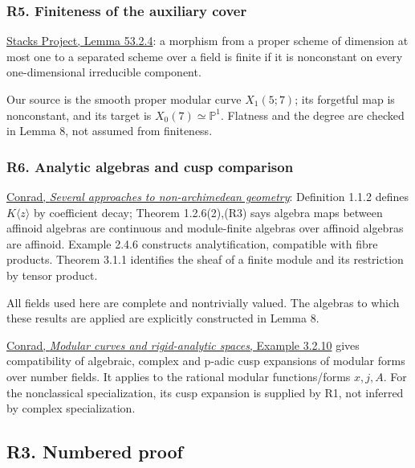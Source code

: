 \documentclass[11pt,a4paper]{article}
\begin{document}
\hypertarget{r5.-finiteness-of-the-auxiliary-cover}{%
\subsubsection{R5. Finiteness of the auxiliary cover}\label{r5.-finiteness-of-the-auxiliary-cover}}

\href{https://stacks.math.columbia.edu/tag/0BXX}{Stacks Project, Lemma 53.2.4}: a morphism from a proper scheme of dimension at most one to a separated scheme over a field is finite if it is nonconstant on every one-dimensional irreducible component.

Our source is the smooth proper modular curve \(X_1(5;7)\); its forgetful map is nonconstant, and its target is \(X_0(7)\simeq\mathbb P^1\). Flatness and the degree are checked in Lemma 8, not assumed from finiteness.

\hypertarget{r6.-analytic-algebras-and-cusp-comparison}{%
\subsubsection{R6. Analytic algebras and cusp comparison}\label{r6.-analytic-algebras-and-cusp-comparison}}

\href{https://swc-math.github.io/aws/2007/ConradNotes11Mar.pdf}{Conrad, \emph{Several approaches to non-archimedean geometry}}: Definition 1.1.2 defines \(K\langle z\rangle\) by coefficient decay; Theorem 1.2.6(2),(R3) says algebra maps between affinoid algebras are continuous and module-finite algebras over affinoid algebras are affinoid. Example 2.4.6 constructs analytification, compatible with fibre products. Theorem 3.1.1 identifies the sheaf of a finite module and its restriction by tensor product.

All fields used here are complete and nontrivially valued. The algebras to which these results are applied are explicitly constructed in Lemma 8.

\href{https://math.stanford.edu/~conrad/papers/genpaper.pdf}{Conrad, \emph{Modular curves and rigid-analytic spaces}, Example 3.2.10} gives compatibility of algebraic, complex and p-adic cusp expansions of modular forms over number fields. It applies to the rational modular functions/forms \(x,j,A\). For the nonclassical specialization, its cusp expansion is supplied by R1, not inferred by complex specialization.

\hypertarget{r3.-numbered-proof}{%
\subsection{R3. Numbered proof}\label{r3.-numbered-proof}}
\end{document}

